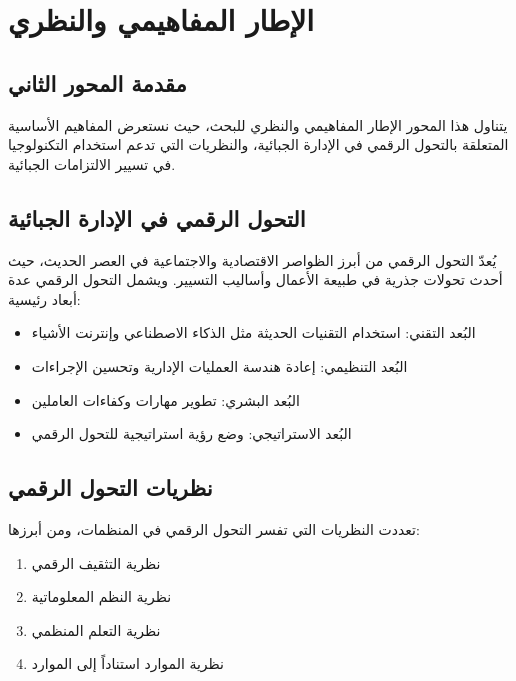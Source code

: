 \documentclass[12pt, a4paper, twoside]{report}
\begin{document}
\newpage

\chapter{الإطار المفاهيمي والنظري}

\section{مقدمة المحور الثاني}

يتناول هذا المحور الإطار المفاهيمي والنظري للبحث، حيث نستعرض المفاهيم الأساسية المتعلقة بالتحول الرقمي في الإدارة الجبائية، والنظريات التي تدعم استخدام التكنولوجيا في تسيير الالتزامات الجبائية.

\section{التحول الرقمي في الإدارة الجبائية}

يُعدّ التحول الرقمي من أبرز الظواصر الاقتصادية والاجتماعية في العصر الحديث، حيث أحدث تحولات جذرية في طبيعة الأعمال وأساليب التسيير. ويشمل التحول الرقمي عدة أبعاد رئيسية:
\begin{itemize}
    \item البُعد التقني: استخدام التقنيات الحديثة مثل الذكاء الاصطناعي وإنترنت الأشياء
    \item البُعد التنظيمي: إعادة هندسة العمليات الإدارية وتحسين الإجراءات
    \item البُعد البشري: تطوير مهارات وكفاءات العاملين
    \item البُعد الاستراتيجي: وضع رؤية استراتيجية للتحول الرقمي
\end{itemize}

\section{نظريات التحول الرقمي}

تعددت النظريات التي تفسر التحول الرقمي في المنظمات، ومن أبرزها:
\begin{enumerate}
    \item نظرية التثقيف الرقمي
    \item نظرية النظم المعلوماتية
    \item نظرية التعلم المنظمي
    \item نظرية الموارد استناداً إلى الموارد
\end{enumerate}
\end{document}
